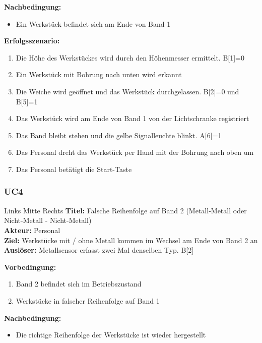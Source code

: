 \documentclass[oneside,a4paper,titlepage]{scrartcl}              %
\begin{document}
\textbf{Nachbedingung:}
\begin{itemize}
  \item Ein Werkstück befindet sich am Ende von Band 1
\end{itemize}

\textbf{Erfolgsszenario:}
\begin{enumerate}
  \item Die Höhe des Werkstückes wird durch den Höhenmesser ermittelt. B[1]=0
  \item Ein Werkstück mit Bohrung nach unten wird erkannt
  \item Die Weiche wird geöffnet und das Werkstück durchgelassen. B[2]=0 und B[5]=1
  \item Das Werkstück wird am Ende von Band 1 von der Lichtschranke registriert
  \item Das Band bleibt stehen und die gelbe Signalleuchte blinkt. A[6]=1
  \item Das Personal dreht das Werkstück per Hand mit der Bohrung nach oben um
  \item Das Personal betätigt die Start-Taste
\end{enumerate}

\subsubsection{UC4}
\begin{tabbing}
  Links \= Mitte \= Rechts \kill
  \textbf{Titel:}    \> \> Falsche Reihenfolge auf Band 2 (Metall-Metall oder Nicht-Metall - Nicht-Metall)\\
  \textbf{Akteur:}   \> \> Personal\\
  \textbf{Ziel:}     \> \> Werkstücke mit / ohne Metall kommen im Wechsel am Ende von Band 2 an\\
  \textbf{Auslöser:} \> \> Metallsensor erfasst zwei Mal denselben Typ. B[2]\\
\end{tabbing}

\textbf{Vorbedingung:}
\begin{enumerate}
  \item Band 2 befindet sich im Betriebszustand
  \item Werkstücke in falscher Reihenfolge auf Band 1
\end{enumerate}

\textbf{Nachbedingung:}
\begin{itemize}
  \item Die richtige Reihenfolge der Werkstücke ist wieder hergestellt
\end{itemize}
\end{document}
